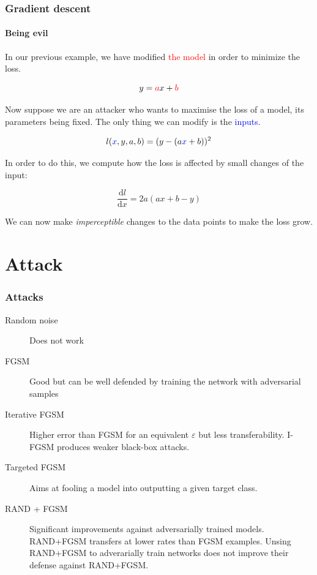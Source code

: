 \documentclass[9pt]{beamer}
\begin{document}
\begin{frame}
  \frametitle{Gradient descent}

  \framesubtitle{Being evil}

  \vspace{-0.5cm}

  \begin{center}
    \scalebox{0.5}{
      
    }
  \end{center}

  In our previous example, we have modified \textcolor{red}{the model}
  in order to minimize the loss.

  \[
  y = \textcolor{red}{a}x + \textcolor{red}{b}
  \]

  \pause

  Now suppose we are an attacker who wants to maximise the loss of a
  model, its parameters being fixed. The only thing we can modify is
  the \textcolor{blue}{inputs}.

  \[
  l(\textcolor{blue}{x}, y, a, b) = (y - (a \textcolor{blue}{x} + b))^{2}
  \]

  \pause

  In order to do this, we compute how the loss is affected by small
  changes of the input:

  \[
  \frac{\mathrm{d}l}{\mathrm{d}x} = 2 a (ax + b - y)
  \]

  We can now make \emph{imperceptible} changes to the data points to make
  the loss grow.
\end{frame}

\section{Attack}

\begin{frame}
  \frametitle{Attacks}

  \begin{description}
  \item[Random noise] Does not work
  \item[FGSM] Good but can be well defended by training the network
    with adversarial samples
  \item[Iterative FGSM] Higher error than FGSM for an equivalent
    $\varepsilon$ but less transferability. I-FGSM produces weaker
    black-box attacks.
  \item[Targeted FGSM] Aims at fooling a model into outputting a given
    target class.
  \item[RAND + FGSM] Significant improvements against adversarially
    trained models. RAND+FGSM transfers at lower rates than FGSM
    examples. Unsing RAND+FGSM to adverarially train networks does not
    improve their defense against RAND+FGSM.
  \end{description}
\end{frame}
\end{document}
